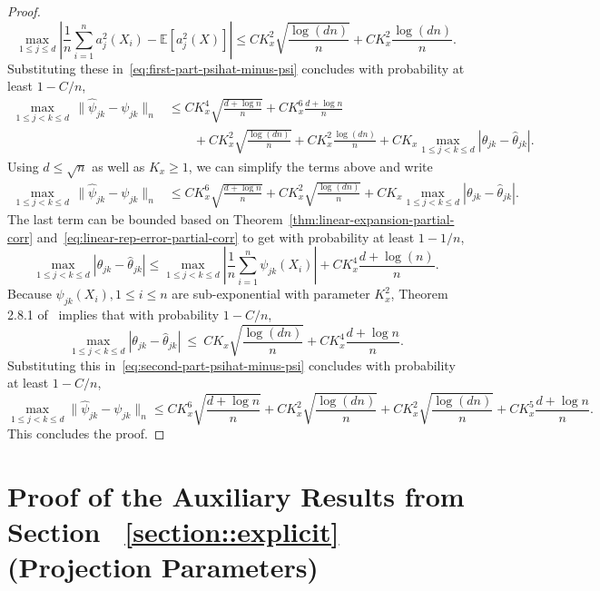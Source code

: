 \documentclass[11pt]{article}
\begin{document}
\begin{appendices}
\begin{proof}
\[
\max_{1\le j\le d}\left|\frac{1}{n}\sum_{i=1}^n a_j^2(X_i) - \mathbb{E}[a_j^2(X)]\right| \le CK_x^2\sqrt{\frac{\log(dn)}{n}} + CK_x^2\frac{\log(dn)}{n}.
\]
Substituting these in~\eqref{eq:first-part-psihat-minus-psi} concludes with probability at least $1 - C/n$, 
\begin{equation}
\begin{split}
\max_{1\le j < k\le d}\,\|\widehat{\psi}_{jk} - \psi_{jk}\|_n &\le CK_x^4\sqrt{\frac{d + \log n}{n}} + CK_x^6\frac{d + \log n}{n}\\
&\qquad+ CK_x^2\sqrt{\frac{\log(dn)}{n}} + CK_x^2\frac{\log(dn)}{n} + CK_x\max_{1\le j < k\le d}|\theta_{jk} - \widehat{\theta}_{jk}|.
\end{split}
\end{equation}
Using  $d \le \sqrt{n}$ as well as $K_x \ge 1$, we can simplify the terms above and write
\begin{equation}\label{eq:second-part-psihat-minus-psi}
\begin{split}
\max_{1\le j < k\le d}\,\|\widehat{\psi}_{jk} - \psi_{jk}\|_n &\le CK_x^6\sqrt{\frac{d + \log n}{n}} + CK_x^2\sqrt{\frac{\log(dn)}{n}} + CK_x\max_{1\le j < k\le d}|\theta_{jk} - \widehat{\theta}_{jk}|.
\end{split}
\end{equation}
The last term can be bounded based on Theorem~\ref{thm:linear-expansion-partial-corr} and~\eqref{eq:linear-rep-error-partial-corr} to get with probability at least $1 - 1/n$,
\[
\max_{1\le j < k\le d}|\theta_{jk} - \widehat{\theta}_{jk}| \le \max_{1\le j < k\le d}\left|\frac{1}{n}\sum_{i=1}^n \psi_{jk}(X_i)\right| + CK_x^4\frac{d + \log(n)}{n}.
\]
Because $\psi_{jk}(X_i), 1\le i\le n$ are sub-exponential with parameter $K_x^2$, Theorem 2.8.1 of~\cite{Vershynin18} implies that with probability $1 - C/n$,
\[
\max_{1\le j < k\le d}|\theta_{jk} - \widehat{\theta}_{jk}| ~\le~ CK_x\sqrt{\frac{\log(dn)}{n}} + CK_x^4\frac{d + \log n}{n}. 
\]
Substituting this in~\eqref{eq:second-part-psihat-minus-psi} concludes with probability at least $1 - C/n$,
\[
\max_{1\le j < k\le d}\|\widehat{\psi}_{jk} - \psi_{jk}\|_n \le CK_x^6\sqrt{\frac{d + \log n}{n}} + CK_x^2\sqrt{\frac{\log(dn)}{n}} + CK_x^2\sqrt{\frac{\log(dn)}{n}} + CK_x^5\frac{d + \log n}{n}.
\]
This concludes the proof.
\end{proof}







\section{Proof of the Auxiliary Results from Section ~\ref{section::explicit} (Projection Parameters)}
\label{appendix:auxiliary.ols}


\end{appendices}
\end{document}
